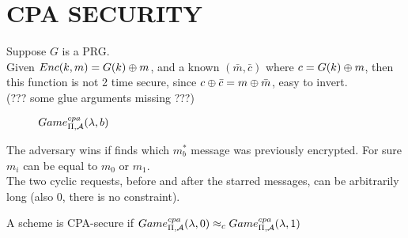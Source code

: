 \section{CPA SECURITY}

Suppose $G$ is a PRG.\\
Given $Enc(k,m)=G(k) \oplus m$, and a known $(\bar{m}, \bar{c})$ where
$c=G(k)\oplus m$, then this function is not 2 time secure, since $c \oplus
\bar{c}=m \oplus \bar{m}$, easy to invert.\\
(??? some glue arguments missing ???)\\
\[
\]


\begin{figure}[h!]
   \centering
   \sdinit{}
   \caption{$Game_{\Pi, \mathcal{A}}^{cpa}(\lambda, b)$}
   \label{fig:cpa1}
\end{figure}
The adversary wins if finds which $m_{b}^{*}$ message was previously encrypted.
For sure $m_{i}$ can be equal to $m_{0}$ or $m_{1}$.\\
The two cyclic requests, before and after the starred messages, can be
arbitrarily long (also 0, there is no constraint).
\begin{definition}
  A scheme is CPA-secure if $Game_{\Pi, \mathcal{A}}^{cpa}(\lambda,0)
    \approx_{c}Game_{\Pi, \mathcal{A}}^{cpa}(\lambda,1)  $
\end{definition}

